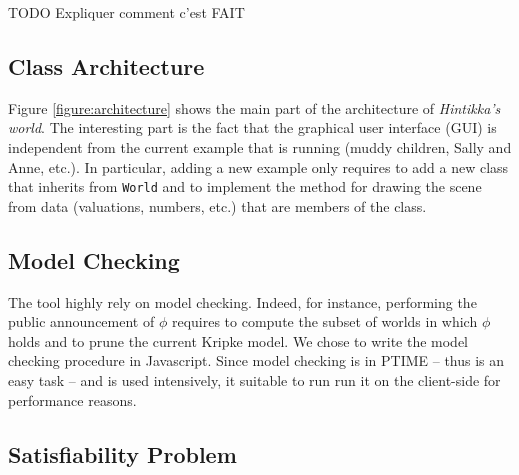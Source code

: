 
TODO Expliquer comment c'est FAIT

\subsection{Class Architecture}

Figure \ref{figure:architecture} shows the main part of the architecture of \emph{Hintikka's world}. The interesting part is the fact that the graphical user interface (GUI) is independent from the current example that is running (muddy children, Sally and Anne, etc.). In particular, adding a new example only requires to add a new class that inherits from \texttt{World} and to implement the method for drawing the scene from data (valuations, numbers, etc.) that are members of the class.

\subsection{Model Checking}

The tool highly rely on model checking. Indeed, for instance, performing the public announcement of $\phi$ requires to compute the subset of worlds in which $\phi$ holds and to prune the current Kripke model. We chose to write the  model checking procedure in Javascript. Since model checking is in PTIME -- thus is an easy task -- and is used intensively, it suitable to run run it on the client-side  for performance reasons.

\subsection{Satisfiability Problem}



